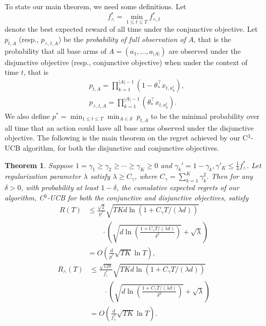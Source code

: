\documentclass{article}
\newcommand{\cS}{\mathcal{S}}
\newcommand{\abs}[1]{\left| #1 \right|}
\newtheorem{theorem}{Theorem}[section]
\begin{document}
To state our main theorem, we need some definitions. Let
$$
f_{\wedge}^* = \min_{1 \leq t \leq T} f_{\wedge, t}^{\ast}
$$
denote the best expected reward of all time under the conjunctive objective.
Let $p_{t, A}$ (resp., $p_{\wedge, t, A}$) be the {\em probability of full
	observation of $A$}, that is the probability that all base arms of $A = (a_1, \ldots, a_{\abs{A}})$ are observed under the disjunctive objective (resp., conjunctive objective) when under the context of time $t$, that is 
\begin{align*}
&p_{t, A} = \prod_{k=1}^{\abs{A}-1} (1 - \theta_{\ast}^{\top} x_{t, a_k^t}),\\
&p_{\wedge, t, A} = \prod_{k=1}^{\abs{A}-1} (\theta_{\ast}^{\top} x_{t, a_k^t}).
\end{align*}
We also define $p^* = \min_{1 \leq t \leq T} \min_{A \in \cS} ~ p_{t, A}$ to be the minimal probability over all time that an action could have all base arms observed under the disjunctive objective. The following is the main theorem on the regret achieved by our C$^3$-UCB algorithm, for both the disjunctive and conjunctive objectives.
\begin{theorem}
\label{thm:main}
Suppose $1 = \gamma_1 \geq \gamma_2 \geq \cdots \geq \gamma_{K} \geq 0$ and 
$\gamma_k' = 1 - \gamma_k, \gamma'_K \leq \frac{1}{4}f_{\wedge}^{\ast}$.
Let regularization parameter $\lambda$ satisfy $\lambda \geq C_\gamma$, where $C_\gamma = \sum_{k=1}^{K} \gamma_k^2$. Then for any $\delta > 0$, with probability at least $1 - \delta$, the cumulative expected regrets of our algorithm, C$^3$-UCB for both the conjunctive and disjunctive objectives, satisfy
\begin{align}
R(T) &\le \frac{\sqrt{2}}{p^*} \sqrt{TKd\ln(1 + C_\gamma T/(\lambda d))}  \nonumber \\
&\qquad \cdot \left(\sqrt{d\ln \left( \frac{1 + C_\gamma T/(\lambda d)}{\delta^2}\right) } + \sqrt{\lambda}\right) \nonumber \\
&=O\left(\frac{d}{p^*} \sqrt{TK} \ln T\right),
\end{align}
\begin{align}
R_{\wedge}(T) &\le \frac{\sqrt{128}}{f_{\wedge}^{\ast}} \sqrt{TKd\ln(1 + C_\gamma T/(\lambda d))} \nonumber \\
&\qquad \cdot \left(\sqrt{d\ln \left( \frac{1 + C_\gamma T/(\lambda d)}{\delta^2}\right) } + \sqrt{\lambda}\right) \nonumber \\
&=O\left(\frac{d}{f_{\wedge}^{\ast}}\sqrt{TK} \ln T\right).
\end{align}
\end{theorem}
\end{document}

